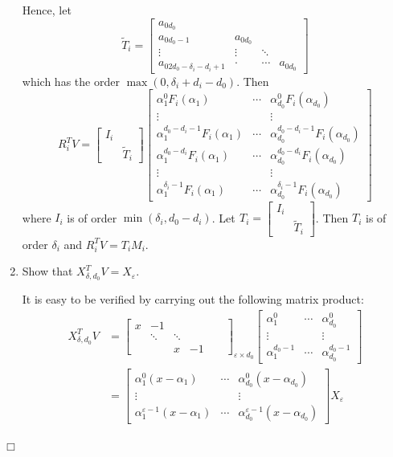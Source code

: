 \documentclass{article}
\newenvironment{proof}{\noindent{\em Proof:}}{$\Box$~\\}
\begin{document}
\begin{proof}
\begin{enumerate}
Hence, let
$$\tilde{T}_i=\begin{bmatrix}
a_{0d_0}\\
a_{0d_0-1}&a_{0d_0}\\
\vdots&\vdots&\ddots\\
a_{02d_0-\delta_i-d_i+1}&\cdot&\cdots&a_{{0d_0}}
\end{bmatrix}$$
which has the order ${\max (0,{\delta _i} + {d_i} - {d_0})}$.
Then
\[{R_i^TV} =\begin{bmatrix}
I_i&\\
&\tilde{T}_i\end{bmatrix}
\left[ {\begin{array}{*{20}{c}}
{\alpha _1^0{F_i}({\alpha _1})}& \cdots &{\alpha _{{d_0}}^0{F_i}({\alpha _{{d_0}}})}\\
 \vdots &{}& \vdots \\
{\alpha _1^{{d_0} - {d_i} - 1}{F_i}({\alpha _1})}& \cdots &{\alpha _{{d_0}}^{{d_0} - {d_i} - 1}{F_i}({\alpha _{{d_0}}})}\\
\hline
{\alpha _1^{{d_0} - {d_i}}{F_i}({\alpha _1})}& \cdots &{\alpha _{{d_0}}^{{d_0} - {d_i}}{F_i}({\alpha _{{d_0}}})}\\
 \vdots &{}& \vdots \\
{\alpha _1^{{\delta _i} - 1}{F_i}({\alpha _1})}& \cdots &{\alpha _{{d_0}}^{{\delta _i} - 1}{F_i}({\alpha _{{d_0}}})}
\end{array}} \right]
\]
where $I_{i}$ is of order ${\min ({\delta _i},{d_0} - {d_i})}$. Let
$_{}T_{i}=\begin{bmatrix}
I_i&\\
&\tilde{T}_i\end{bmatrix}$.
Then $T_{i}$ is  of order $\delta_i$ and  ${R_i^TV} =T_iM_i$.

\item Show that $X_{\delta,d_0}^TV=X_{\varepsilon}$.

It is easy to be verified by carrying out the following matrix product:
\begin{align*}
X_{\delta,d_0}^TV&=
\begin{bmatrix}
x&-1&&&&\\
&\ddots&\ddots&&&\\
&&x&-1&&
\end{bmatrix}_{\varepsilon\times d_0}
\begin{bmatrix}
{\alpha _1^0}& \cdots &{\alpha _{{d_0}}^0}\\
 \vdots &{}& \vdots \\
{\alpha _1^{{d_0} - 1}}& \cdots &{\alpha _{d_{0}}^{{d_0} - 1}}
\end{bmatrix}\\
&=\begin{bmatrix}
\alpha_1^0(x-\alpha_1)&\cdots&\alpha_{d_0}^0(x-\alpha_{d_0})\\
\vdots&&\vdots\\
\alpha_1^{\varepsilon-1}(x-\alpha_1)&\cdots&\alpha_{d_0}^{\varepsilon-1}(x-\alpha_{d_0})
\end{bmatrix}X_{\varepsilon}
\end{align*}
\end{enumerate}


\end{proof}
\end{document}
